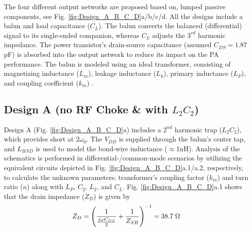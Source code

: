 \documentclass[conference]{IEEEtran}
\begin{document}
The four different  output networks are proposed based on, lumped passive components, see Fig. \ref{fig:Design_A_B_C_D}a/b/c/d. All the designs include a balun and load capacitance ($C_L$). The balun converts the balanced (differential) signal to its single-ended companion, whereas $C_L$ adjusts the $3^{rd}$ harmonic impedance. The power transistor's drain-source capacitance (assumed $C_{DS}=1.87$pF) is absorbed into the output network to reduce its impact on the PA performance. The balun is modeled using an ideal transformer, consisting of magnetizing inductance ($L_m$), leakage inductance ($L_k$), primary inductance ($L_P$), and coupling coefficient ($k_m$) \cite{Transformer_model}. 

\subsection{Design A (no RF Choke \& with $L_2C_2$)}
Design A (Fig. \ref{fig:Design_A_B_C_D}a) includes a $2^{nd}$ harmonic trap ($L_2C_2$), which provides short at $2\omega_0$. The $V_{DD}$ is supplied through the balun's center tap, and $L_{BND}$ is used to model the bond-wire inductance ($\approx$1nH). Analysis of the schematics is performed in differential-/common-mode scenarios by utilizing the equivalent circuits depicted in Fig. \ref{fig:Design_A_B_C_D}a.1/a.2, respectively, to calculate the unknown parameters: transformer's coupling factor ($k_m$) and turn ratio ($n$) along with  $L_P$, $C_2$, $L_2$, and $C_L$. Fig. \ref{fig:Design_A_B_C_D}a.1 shows that the drain impedance ($Z_D$) is given by
\vspace{-0.05in}
\begin{equation}
	Z_D=\left(\frac{1}{\frac{j\omega C_{DS}}{2}}+\frac{1}{Z_{SB}}\right)^{-1}=38.7 \hspace{1mm} \Omega
	\label{eqn:ZD}
\end{equation}
\end{document}

